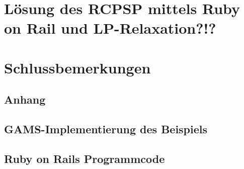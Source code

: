 \documentclass[a4paper,12pt,parskip,bibtotoc,liststotoc]{article}
\begin{document}
\section{Lösung des RCPSP mittels Ruby on Rail und LP-Relaxation?!?} \label{Grund}

\section{Schlussbemerkungen}

\newpage

\newpage
%
%
\begin{appendix}
\section{Anhang}

\subsection{GAMS-Implementierung des Beispiels}\label{Imp}

\subsection{Ruby on Rails Programmcode}\label{Anhang2}


\end{appendix}
\end{document}
